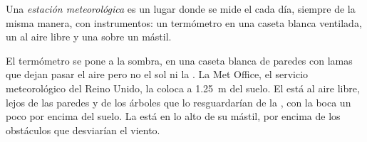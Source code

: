 \begin{definition}\label{def:g4:clouds-rain-snow:weather-station}
Una \emph{estación meteorológica}
es un lugar donde se mide el  cada día, siempre de la misma manera,
con instrumentos: un termómetro en una caseta blanca ventilada, un
 al aire libre y una  sobre un mástil.
\end{definition}

El termómetro se pone a la sombra, en una caseta blanca de paredes con
lamas que dejan pasar el aire pero no el sol ni la . La Met Office, el
servicio meteorológico del Reino Unido, la coloca a \SI{1.25}{\metre} del
suelo. El  está al aire libre, lejos de las paredes y de los
árboles que lo resguardarían de la , con la boca un poco por encima
del suelo. La  está en lo alto de su mástil, por encima de los
obstáculos que desviarían el viento.


